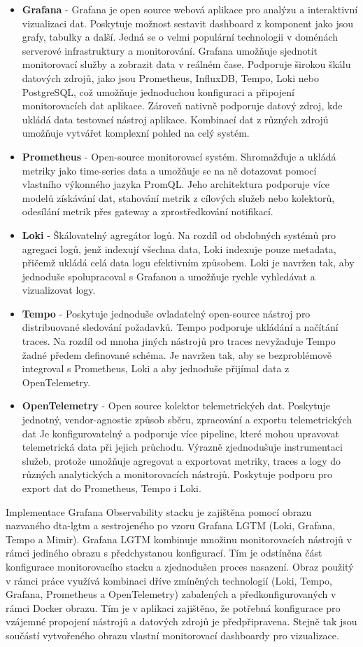 \begin{itemize}
  \item \textbf{Grafana} - Grafana je open source webová aplikace pro analýzu a interaktivní vizualizaci dat. Poskytuje možnost sestavit dashboard z komponent jako jsou grafy, tabulky a další. Jedná se o velmi populární technologii v doménách serverové infrastruktury a monitorování. Grafana umožňuje sjednotit monitorovací služby a zobrazit data v reálném čase. Podporuje širokou škálu datových zdrojů, jako jsou Prometheus, InfluxDB, Tempo, Loki nebo PostgreSQL, což umožňuje jednoduchou konfiguraci a připojení monitorovacích dat aplikace. Zároveň nativně podporuje datový zdroj, kde ukládá data testovací nástroj aplikace. Kombinací dat z různých zdrojů umožňuje vytvářet komplexní pohled na celý systém.
  \item \textbf{Prometheus} - Open-source monitorovací systém. Shromažďuje a ukládá metriky jako time-series data a umožňuje se na ně dotazovat pomocí vlastního výkonného jazyka PromQL. Jeho architektura podporuje více modelů získávání dat, stahování metrik z cílových služeb nebo kolektorů, odesílání metrik přes gateway a zprostředkování notifikací.
  \item \textbf{Loki} - Škálovatelný agregátor logů. Na rozdíl od obdobných systémů pro agregaci logů, jenž indexují všechna data, Loki indexuje pouze metadata, přičemž ukládá celá data logu efektivním způsobem. Loki je navržen tak, aby jednoduše spolupracoval s Grafanou a umožňuje rychle vyhledávat a vizualizovat logy.
  \item \textbf{Tempo} - Poskytuje jednoduše ovladatelný open-source nástroj pro distribuované sledování požadavků. Tempo podporuje ukládání a načítání traces. Na rozdíl od mnoha jiných nástrojů pro traces nevyžaduje Tempo žadné předem definované schéma. Je navržen tak, aby se bezproblémově integroval s Prometheus, Loki a aby jednoduše přijímal data z OpenTelemetry.
  \item \textbf{OpenTelemetry} - Open source kolektor telemetrických dat. Poskytuje jednotný, vendor-agnostic způsob sběru, zpracování a exportu telemetrických dat  Je konfigurovatelný a podporuje více pipeline, které mohou upravovat telemetrická data při jejich průchodu. Výrazně zjednodušuje instrumentaci služeb, protože umožňuje agregovat a exportovat metriky, traces a logy do různých analytických a monitorovacích nástrojů. Poskytuje podporu pro export dat do Prometheus, Tempo i Loki.
\end{itemize}

Implementace Grafana Observability stacku je zajištěna pomocí obrazu nazvaného dta-lgtm a sestrojeného po vzoru Grafana LGTM (Loki, Grafana, Tempo a Mimir). Grafana LGTM kombinuje množinu monitorovacích nástrojů v rámci jediného obrazu s předchystanou konfigurací. Tím je odstíněna část konfigurace monitorovacího stacku a zjednodušen proces nasazení. Obraz použitý v rámci práce využívá kombinaci dříve zmíněných technologií (Loki, Tempo, Grafana, Prometheus a OpenTelemetry) zabalených a předkonfigurovaných v rámci Docker obrazu. Tím je v aplikaci zajištěno, že potřebná konfigurace pro vzájemné propojení nástrojů a datových zdrojů je předpřipravena. Stejně tak jsou součástí vytvořeného obrazu vlastní monitorovací dashboardy pro vizualizace.

